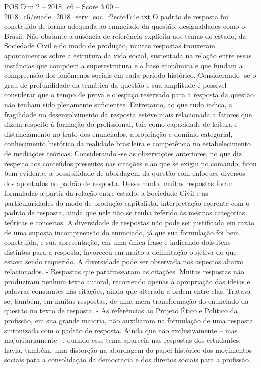 \begin{textsample}{POS Dim 2 – 2018\_c6 – Score 3.00 – 2018\_c6/enade\_2018\_serv\_soc\_f2ecfc474e.txt}
O padrão de resposta foi construído de forma adequada ao enunciado da questão. desigualdades como o Brasil.
Não obstante a ausência de referência explícita aos temas do estado, da Sociedade Civil e do modo de produção, muitas respostas trouxeram apontamentos sobre a estrutura da vida social, sustentada na relação entre essas instâncias que compõem a superestrutura e a base econômica e que fundam a compreensão dos fenômenos sociais em cada período histórico.
Considerando -se o grau de profundidade da temática da questão e sua amplitude é possível considerar que o tempo de prova e o espaço reservado para a resposta da questão não tenham sido plenamente suficientes.
Entretanto, ao que tudo indica, a fragilidade no desenvolvimento da resposta esteve mais relacionada a fatores que dizem respeito à formação do profissional, tais como capacidade de leitura e distanciamento no trato dos enunciados, apropriação e domínio categorial, conhecimento histórico da realidade brasileira e competência no estabelecimento de mediações teóricas.
Considerando -se as observações anteriores, no que diz respeito aos conteúdos presentes nas citações e ao que se exigiu no comando, ficou bem evidente, a possibilidade de abordagem da questão com enfoques diversos dos apontados no padrão de resposta.
Desse modo, muitas respostas foram formuladas a partir da relação entre estado, a Sociedade Civil e as particularidades do modo de produção capitalista, interpretação coerente com o padrão de resposta, ainda que nele não se tenha referido às mesmas categorias teóricas e conceitos.
A diversidade de respostas não pode ser justificada em razão de uma suposta incompreensão do enunciado, já que sua formulação foi bem construída, e sua apresentação, em uma única frase e indicando dois itens distintos para a resposta, favoreceu em muito a delimitação objetiva do que estava sendo requerido.
A diversidade pode ser observada nos aspectos abaixo relacionados. - Respostas que parafrasearam as citações.
Muitas respostas não produziram nenhum texto autoral, recorrendo apenas à apropriação das ideias e palavras constantes nas citações, ainda que alterada a ordem entre elas.
Tratava -se, também, em muitas respostas, de uma mera transformação do enunciado da questão no texto de resposta. - As referências ao Projeto Ético e Político da profissão, em sua grande maioria, não auxiliaram na formulação de uma resposta sintonizada com o padrão de resposta.
Ainda que não exclusivamente – mas majoritariamente –, quando esse tema aparecia nas respostas dos estudantes, havia, também, uma distorção na abordagem do papel histórico dos movimentos sociais para a consolidação da democracia e dos direitos sociais para a profissão.

\end{textsample}
